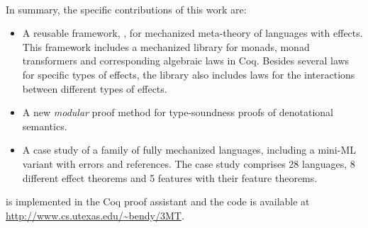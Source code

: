 \begin{comment}
In previous work, we have proposed a solution for allowing modularity
in two dimensions simultaneously: operations/proofs and language constructs.
While for operations we were able, for the most part, to built on
existing solutions to the expression problem for mainstream languages,
dealing with proofs modularly required new techniques. In particular,
we had to develop new techniques which allowed us to express
\emph{inductive proofs} in a modular way. However, that work did
not provide a modular solution for effects. As a result, our meta-theory
framework was effectively limited to \emph{pure} languages.

In this work we provide a \emph{modular} solution for effects
that in combination with MTC allows the development of modular meta-theory
for languages with \emph{effects}. Much like our previous work,
dealing only with operations (not proofs) can, for the most part,
be done using existing techniques~\cite{j}. However, once again, the
key challenge lies in how to modularize theorems and proofs along the
three dimensions of modularity.
\end{comment}

\paragraph{}
In summary, the specific contributions of this work are:
\begin{itemize}

\item A reusable framework, \Name, for mechanized meta-theory of languages with effects.
This framework includes a mechanized library for monads, monad transformers and
corresponding algebraic laws in Coq. Besides several laws for
specific types of effects, the library also includes laws for
the interactions between different types of effects.

\item A new \emph{modular} proof method for type-soundness proofs of denotational semantics.

\item A case study of a family of fully mechanized languages, including
a mini-ML variant with errors and references. The case study comprises
28 languages, 8 different effect theorems and 5 features with their feature theorems.

\end{itemize}

\noindent\name is implemented in the Coq proof assistant and the code is available at
\url{http://www.cs.utexas.edu/~bendy/3MT}.


